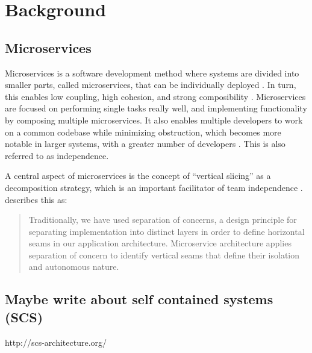 \chapter{Background}

\section{Microservices}
Microservices is a software development method where systems are divided into smaller parts, called microservices, that can be individually deployed \cite{Richardson2019}. In turn, this enables low coupling, high cohesion, and strong composibility \cites[ch.~1]{Newman2015a}{Richardson2019}. Microservices are focused on performing single tasks really well, and implementing functionality by composing multiple microservices. It also enables multiple developers to work on a common codebase while minimizing obstruction, which becomes more notable in larger systems, with a greater number of developers \cite{Newman2015a}. This is also referred to as independence.

A central aspect of microservices is the concept of ``vertical slicing'' as a decomposition strategy, which is an important facilitator of team independence \cite{Familiar2015,Ratner2011}. \citeauthor{Familiar2015} describes this as: 
\blockquote{Traditionally, we have used separation of concerns, a design principle for separating implementation into distinct layers in order to define horizontal seams in our application architecture. Microservice architecture applies separation of concern to identify vertical seams that define their isolation and autonomous nature. \cite[p.~xx]{Familiar2015}}


\section{Maybe write about self contained systems (SCS)}
http://scs-architecture.org/